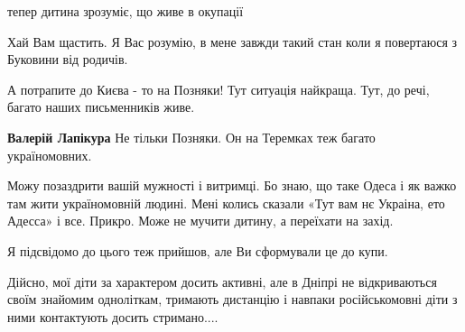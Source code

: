 \begin{itemize}
тепер дитина зрозуміє, що живе в окупації

 
Хай Вам щастить. Я Вас розумію, в мене завжди такий стан коли я повертаюся з Буковини від родичів.

 
А потрапите до Києва - то на Позняки! Тут ситуація найкраща. Тут, до речі,
багато наших письменників живе.

\begin{itemize}
 
\textbf{Валерій Лапікура} Не тільки Позняки. Он на Теремках теж багато україномовних.
\end{itemize}

 

Можу позаздрити вашій мужності і витримці. Бо знаю, що таке Одеса і як важко
там жити україномовній людині. Мені колись сказали «Тут вам нє Украіна, ето
Адесса» і все. Прикро. Може не мучити дитину, а переїхати на захід.


 

Я підсвідомо до цього теж прийшов, але Ви сформували це до купи.

Дійсно, мої діти за характером досить активні, але в Дніпрі не відкриваються
своїм знайомим одноліткам, тримають дистанцію і навпаки російськомовні діти з
ними контактують досить стримано....


\end{itemize}

